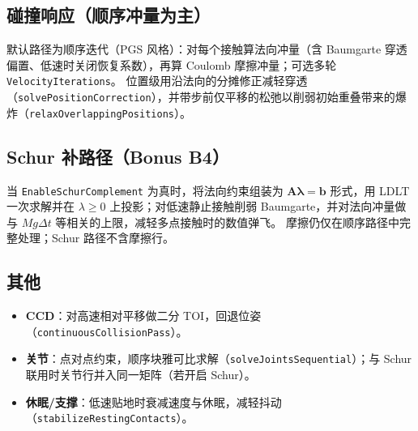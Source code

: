 \documentclass[UTF8,a4paper,11pt]{ctexart}
\begin{document}
\subsection{碰撞响应（顺序冲量为主）}
默认路径为顺序迭代（PGS 风格）：对每个接触算法向冲量（含 Baumgarte 穿透偏置、低速时关闭恢复系数），再算 Coulomb 摩擦冲量；可选多轮 \texttt{VelocityIterations}。
位置级用沿法向的分摊修正减轻穿透（\texttt{solvePositionCorrection}），并带步前仅平移的松弛以削弱初始重叠带来的爆炸（\texttt{relaxOverlappingPositions}）。

\subsection{Schur 补路径（Bonus B4）}
当 \texttt{EnableSchurComplement} 为真时，将法向约束组装为 $\mathbf{A}\boldsymbol{\lambda}=\mathbf{b}$ 形式，用 LDLT 一次求解并在 $\lambda\ge 0$ 上投影；对低速静止接触削弱 Baumgarte，并对法向冲量做与 $M g\Delta t$ 等相关的上限，减轻多点接触时的数值弹飞。
摩擦仍仅在顺序路径中完整处理；Schur 路径不含摩擦行。

\subsection{其他}
\begin{itemize}[leftmargin=*]
  \item \textbf{CCD}：对高速相对平移做二分 TOI，回退位姿（\texttt{continuousCollisionPass}）。
  \item \textbf{关节}：点对点约束，顺序块雅可比求解（\texttt{solveJointsSequential}）；与 Schur 联用时关节行并入同一矩阵（若开启 Schur）。
  \item \textbf{休眠/支撑}：低速贴地时衰减速度与休眠，减轻抖动（\texttt{stabilizeRestingContacts}）。
\end{itemize}
\end{document}
